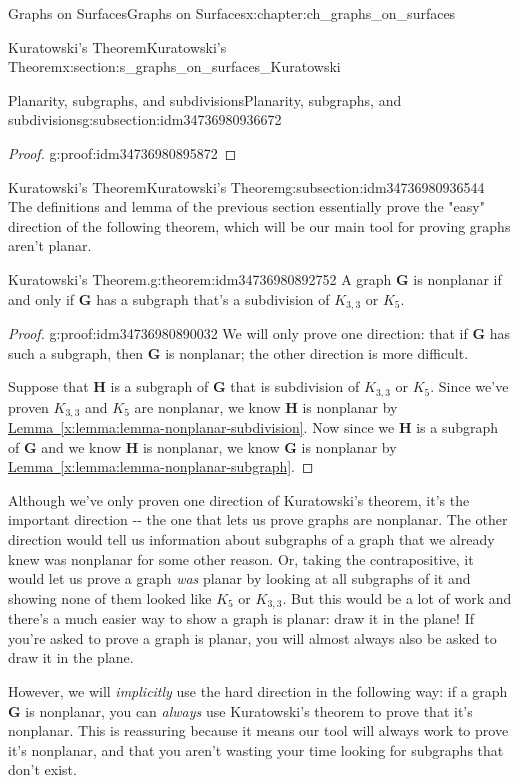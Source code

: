 \documentclass[oneside,10pt,]{book}
\newcommand{\xreffont}{\relax}
\numberwithin{equation}{section}
\newcommand{\bfG}{\mathbf{G}}
\newcommand{\bfH}{\mathbf{H}}
\begin{document}
\begin{chapterptx}{Graphs on Surfaces}{}{Graphs on Surfaces}{}{}{x:chapter:ch_graphs_on_surfaces}
\begin{sectionptx}{Kuratowski's Theorem}{}{Kuratowski's Theorem}{}{}{x:section:s_graphs_on_surfaces_Kuratowski}
\begin{subsectionptx}{Planarity, subgraphs, and subdivisions}{}{Planarity, subgraphs, and subdivisions}{}{}{g:subsection:idm34736980936672}
\begin{proof}{}{g:proof:idm34736980895872}
\end{proof}
\end{subsectionptx}
%
%
\typeout{************************************************}
\typeout{************************************************}
%
\begin{subsectionptx}{Kuratowski's Theorem}{}{Kuratowski's Theorem}{}{}{g:subsection:idm34736980936544}
The definitions and lemma of the previous section essentially prove the "easy" direction of the following theorem, which will be our main tool for proving graphs aren't planar.%
\begin{theorem}{Kuratowski's Theorem.}{}{g:theorem:idm34736980892752}%
A graph \(\bfG\) is nonplanar if and only if \(\bfG\) has a subgraph that's a subdivision of \(K_{3,3}\) or \(K_5\).%
\end{theorem}
\begin{proof}{}{g:proof:idm34736980890032}
We will only prove one direction: that if \(\bfG\) has such a subgraph, then \(\bfG\) is nonplanar; the other direction is more difficult.%
\par
Suppose that \(\bfH\) is a subgraph of \(\bfG\) that is subdivision of \(K_{3,3}\) or \(K_5\).  Since we've proven \(K_{3,3}\) and \(K_5\) are nonplanar, we know \(\bfH\) is nonplanar by \hyperref[x:lemma:lemma-nonplanar-subdivision]{Lemma~{\xreffont\ref{x:lemma:lemma-nonplanar-subdivision}}}.  Now since we \(\bfH\) is a subgraph of \(\bfG\) and we know \(\bfH\) is nonplanar, we know \(\bfG\) is nonplanar by \hyperref[x:lemma:lemma-nonplanar-subgraph]{Lemma~{\xreffont\ref{x:lemma:lemma-nonplanar-subgraph}}}.%
\end{proof}
Although we've only proven one direction of Kuratowski's theorem, it's the important direction -{}-{} the one that lets us prove graphs are nonplanar.  The other direction would tell us information about subgraphs of a graph that we already knew was nonplanar for some other reason.  Or, taking the contrapositive, it would let us prove a graph \emph{was} planar by looking at all subgraphs of it and showing none of them looked like \(K_5\) or \(K_{3,3}\).  But this would be a lot of work and there's a much easier way to show a graph is planar: draw it in the plane! If you're asked to prove a graph is planar, you will almost always also be asked to draw it in the plane.%
\par
However, we will \emph{implicitly} use the hard direction in the following way: if a graph \(\bfG\) is nonplanar, you can \emph{always} use Kuratowski's theorem to prove that it's nonplanar.  This is reassuring because it means our tool will always work to prove it's nonplanar, and that you aren't wasting your time looking for subgraphs that don't exist.%

\end{subsectionptx}
\end{sectionptx}
\end{chapterptx}
\end{document}
